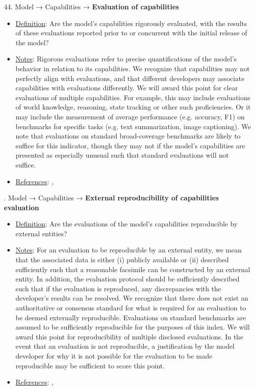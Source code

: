 44. Model → Capabilities → \textbf{Evaluation of capabilities}
\vspace{-\parskip}
\begin{itemize}
	\item
	\underline{Definition}: Are the model’s capabilities rigorously evaluated, with the results of these evaluations reported prior to or concurrent with the initial release of the model?
	\item
	\underline{Notes}: Rigorous evaluations refer to precise quantifications of the model's behavior in relation to its capabilities. We recognize that capabilities may not perfectly align with evaluations, and that different developers may associate capabilities with evaluations differently. We will award this point for clear evaluations of multiple capabilities. For example, this may include evaluations of world knowledge, reasoning, state tracking or other such proficiencies. Or it may include the measurement of average performance (e.g. accuracy, F1) on benchmarks for specific tasks (e.g. text summarization, image captioning). We note that evaluations on standard broad-coverage benchmarks are likely to suffice for this indicator, though they may not if the model's capabilities are presented as especially unusual such that standard evaluations will not suffice.
	\item
	\underline{References}: \citet{srivastava2022bigbench}, \citet{liang2022helm}
\end{itemize} \vspace{\baselineskip}


. Model → Capabilities → \textbf{External reproducibility of capabilities evaluation}
\vspace{-\parskip}
\begin{itemize}
	\item
	\underline{Definition}: Are the evaluations of the model’s capabilities reproducible by external entities?
	\item
	\underline{Notes}: For an evaluation to be reproducible by an external entity, we mean that the associated data is either (i) publicly available or (ii) described sufficiently such that a reasonable facsimile can be constructed by an external entity. In addition, the evaluation protocol should be sufficiently described such that if the evaluation is reproduced, any discrepancies with the developer's results can be resolved. We recognize that there does not exist an authoritative or consensus standard for what is required for an evaluation to be deemed externally reproducible. Evaluations on standard benchmarks are assumed to be sufficiently reproducible for the purposes of this index. We will award this point for reproducibility of multiple disclosed evaluations. In the event that an evaluation is not reproducible, a justification by the model developer for why it is not possible for the evaluation to be made reproducible may be sufficient to score this point.
	\item
	\underline{References}: \citet{kapoor2023leakage}, \citet{liang2022helm}
\end{itemize} \vspace{\baselineskip}


